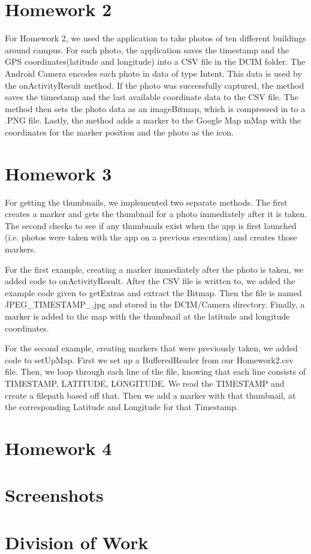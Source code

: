 \documentclass[]{article}
\begin{document}
\section{Homework 2}
For Homework 2, we used the application to take photos of ten different buildings around campus. For each photo, the application saves the timestamp and the GPS coordinates(latitude and longitude) into a CSV file in the DCIM folder. The Android Camera encodes each photo in data of type Intent. This data is used by the onActivityResult method. If the photo was successfully captured, the method saves the timestamp and the last available coordinate data to the CSV file. The method then sets the photo data as an imageBitmap, which is compressed in to a .PNG file. Lastly, the method adds a marker to the Google Map mMap with the coordinates for the marker position and the photo as the icon.
\section{Homework 3}
For getting the thumbnails, we implemented two separate methods. The first creates a marker and gets the thumbnail for a photo immediately after it is taken. The second checks to see if any thumbnails exist when the app is first launched (i.e. photos were taken with the app on a previous execution) and creates those markers.

For the first example, creating a marker immediately after the photo is taken, we added code to onActivityResult. After the CSV file is written to, we added the example code given to getExtras and extract the Bitmap. Then the file is named JPEG\_TIMESTAMP\_.jpg and stored in the DCIM/Camera directory. Finally, a marker is added to the map with the thumbnail at the latitude and longitude coordinates.

For the second example, creating markers that were previously taken, we added code to setUpMap. First we set up a BufferedReader from our Homework2.csv file. Then, we loop through each line of the file, knowing that each line consists of TIMESTAMP, LATITUDE, LONGITUDE. We read the TIMESTAMP and create a filepath based off that. Then we add a marker with that thumbnail, at the corresponding Latitude and Longitude for that Timestamp. 
\section{Homework 4}
\section{Screenshots}
\section{Division of Work}
\end{document}
